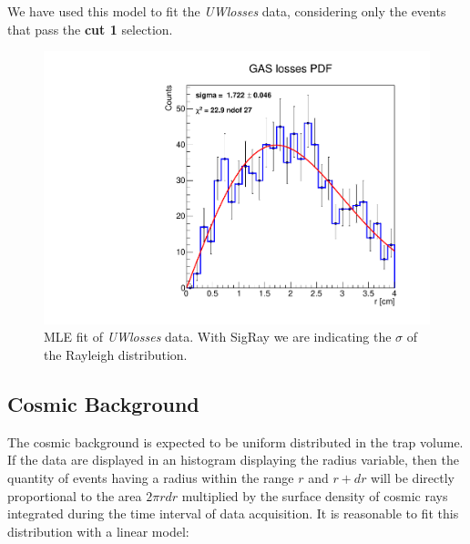 \documentclass[11pt,a4paper,oneside]{article}
\begin{document}
We have used this model to fit the \textit{UWlosses} data, considering only the events that pass the \textbf{cut 1} selection.
\begin{figure}[hbtp]

\centering
\includegraphics[width = 1\textwidth]{../ALPHA-2/PlotMLEfit/SingleModel/FitToUw.pdf}
\caption{ MLE fit of \textit{UWlosses} data. With SigRay we are indicating the $\sigma$ of the Rayleigh distribution.}
\end{figure}

\subsection*{Cosmic Background}

The cosmic background is expected to be uniform distributed in the trap volume. If the data are displayed in an histogram displaying the radius variable, then the quantity of events having a radius within the range $r$ and $r + dr$ will be directly proportional to the area $ 2 \pi r dr$ multiplied by the surface density of cosmic rays integrated during the time interval of data acquisition. It is reasonable to fit this distribution with a linear model:
\end{document}
